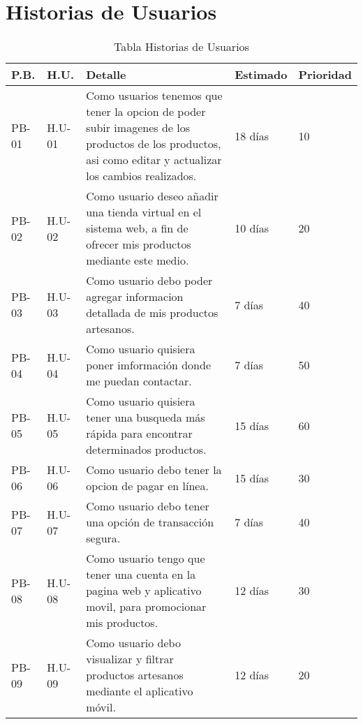 \chapter{Historias de Usuarios}
\begin{table}
	\begin{center}
		\begin{tabular}{|p{1.5cm}|p{1.5cm}|p{6.5cm}|p{2.5cm}|p{1.5cm}|}
			\hline
			P.B. & H.U. & Detalle & Estimado & Prioridad\\
			\hline \hline
			PB-01 & H.U-01 &Como usuarios tenemos que tener la opcion de poder subir imagenes de los productos de los productos, asi como editar y actualizar los cambios realizados.& 18 días  &  10 \\ \hline
			PB-02& H.U-02 & Como usuario deseo añadir una tienda virtual en el sistema web, a fin de ofrecer mis productos mediante este medio.& 10 días &  20 \\ \hline
			PB-03& H.U-03 &Como usuario debo poder agregar informacion detallada de mis productos artesanos.& 7 días &  40 \\ \hline
			PB-04& H.U-04 &Como usuario quisiera poner imformación donde me puedan contactar.& 7 días &  50 \\ \hline
			PB-05& H.U-05 &Como usuario quisiera tener una busqueda más rápida para encontrar determinados productos.& 15 días &  60 \\ \hline
			PB-06& H.U-06 &Como usuario debo tener la opcion de pagar en línea. & 15 días &  30 \\ \hline
			PB-07& H.U-07 &Como usuario debo tener una opción de transacción segura.& 7 días &  40 \\ \hline
			PB-08& H.U-08 &Como usuario tengo que tener una cuenta en la pagina web y aplicativo movil, para promocionar mis productos.& 12 días &  30 \\ \hline
			PB-09& H.U-09 &Como usuario debo visualizar y filtrar productos artesanos mediante el aplicativo móvil. & 12 días &  20 \\ \hline
		\end{tabular}
		\caption{Tabla Historias de Usuarios}
		\label{tabla:sencilla}
	\end{center}
\end{table}

